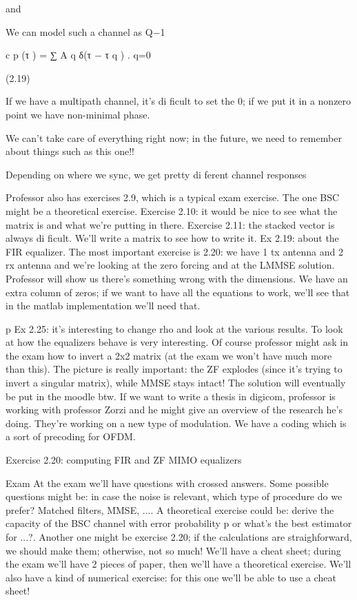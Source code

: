 {{{and

We can model such a channel as Q−1

c p (τ ) = ∑ A q δ(τ − τ q ) .
q=0

(2.19)

If we have a multipath channel, it's di ficult to set the 0; if we put it in a nonzero point we have non-minimal phase.

We can't take care of everything right now; in the future, we need to remember about things such as this one!!

Depending on where we sync, we get pretty di ferent channel responses

Professor also has exercises 2.9, which is a typical exam exercise.
The one BSC might be a theoretical exercise.
Exercise 2.10: it would be nice to see what the matrix is and what we're putting in there.
Exercise 2.11: the stacked vector is always di ficult. We'll write a matrix to see how to write it.
Ex 2.19: about the FIR equalizer.
The most important exercise is 2.20: we have 1 tx antenna and 2 rx antenna and we're looking at the zero forcing and at the LMMSE solution.
Professor will show us there's something wrong with the dimensions. We have an extra column of zeros; if we want to have all the equations to work, we'll see that in the matlab implementation we'll need that.

p Ex 2.25: it's interesting to change rho and look at the various results. To look at how the equalizers behave is very interesting.
Of course professor might ask in the exam how to invert a 2x2 matrix (at the exam we won't have much more than this).
The picture is really important: the ZF explodes (since it's trying to invert a singular matrix), while MMSE stays intact!
The solution will eventually be put in the moodle btw.
If we want to write a thesis in digicom, professor is working with professor Zorzi and he might give an overview of the research he's doing.
They're working on a new type of modulation. We have a coding which is a sort of precoding for OFDM.

Exercise 2.20: computing FIR and ZF MIMO equalizers

Exam At the exam we'll have questions with crossed answers. Some possible questions might be: in case the noise is relevant, which type of procedure do we prefer?
Matched filters, MMSE, ....
A theoretical exercise could be: derive the capacity of the BSC channel with error probability p or what's the best estimator for ...?.
Another one might be exercise 2.20; if the calculations are straighforward, we should make them; otherwise, not so much!
We'll have a cheat sheet; during the exam we'll have 2 pieces of paper, then we'll have a theoretical exercise.
We'll also have a kind of numerical exercise: for this one we'll be able to use a cheat sheet!

}}}
